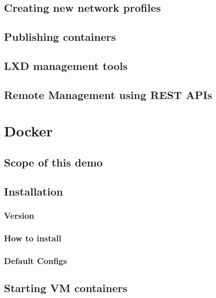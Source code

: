 \documentclass{report}
\begin{document}
\section*{Creating new network profiles}

\section*{Publishing containers}

\section*{LXD management tools}

\section*{Remote Management using REST APIs}
		


\chapter*{Docker}
\section*{Scope of this demo}

\section*{Installation}

\subsection*{Version}
\subsection*{How to install}
\subsection*{Default Configs}

\section*{Starting VM containers}
		
\end{document}
